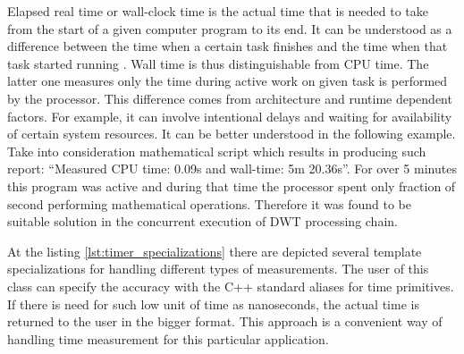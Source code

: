 Elapsed real time or wall-clock time is the actual time that is needed to take from the start of a given
computer program to its end. It can be understood as a difference between the time when a certain task 
finishes and the time when that task started running \cite{wall_clock}. Wall time is thus distinguishable
from CPU time. The latter one measures only the time during active work on given task is performed by the
processor. This difference comes from architecture and runtime dependent factors. For example, it can involve
intentional delays and waiting for availability of certain system resources. It can be better understood
in the following example. Take into consideration mathematical script which results in producing such report:
``Measured CPU time: 0.09s and wall-time: 5m 20.36s''. For over 5 minutes this program was active and during
that time the processor spent only fraction of second performing mathematical operations. Therefore it was
found to be suitable solution in the concurrent execution of DWT processing chain.

At the listing \ref{lst:timer_specializations} there are depicted several template specializations for
handling different types of measurements. The user of this class can specify the accuracy with the C++ standard
aliases for time primitives. If there is need for such low unit of time as nanoseconds, the actual time
is returned to the user in the bigger format. This approach is a convenient way of handling time measurement
for this particular application.

